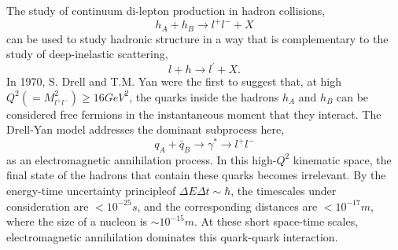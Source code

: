 The study of continuum di-lepton production in hadron collisions,
\begin{equation}
	h_A +  h_B \rightarrow l^+ l^- + X
	\label{eq:hh2ll}
\end{equation} 
can be used to study hadronic structure in a way that is complementary to the study of deep-inelastic scattering,
\begin{equation}
l + h \rightarrow l^\prime + X.
\label{eq:lh2lx}
\end{equation}
In 1970, S. Drell and T.M. Yan were the first to suggest that, at high $Q^2 (=M^2_{l^+ l^-}) \geq 16GeV^2$, the quarks inside the hadrons $h_A$ and $h_B$ can be considered free fermions in the instantaneous moment that they interact. The Drell-Yan model addresses the dominant subprocess here,
\begin{equation}
q_A + \bar{q}_B \rightarrow \gamma^* \rightarrow l^+ l^-
\label{eq:dy-process}
\end{equation} 
as an electromagnetic annihilation process. In this high-$Q^2$ kinematic space, the final state of the hadrons that contain these quarks becomes irrelevant. By the energy-time uncertainty principle\CN of $\Delta E \Delta t \sim \hbar$, the timescales under consideration are $<10^{-25}s$, and the corresponding distances are $<10^{-17}m$, where the size of a nucleon is $\sim 10^{-15}m$\CN. At these short space-time scales, electromagnetic annihilation dominates this quark-quark interaction.

